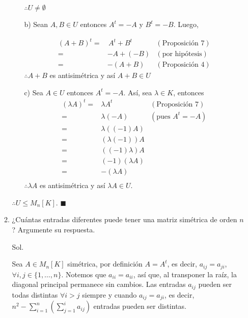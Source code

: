 \documentclass[fleqn]{article}                       %
\begin{document}
\begin{enumerate}
\begin{enumerate}
\begin{enumerate}
                $ \therefore U \neq \emptyset $

                \item[b)] Sean $ A, B \in U $ entonces $ A^t = -A $ y $ B^t = -B $. Luego, \par
                \begin{align*}
                    (A + B)^t =& \, A^t + B^t & (\text{Proposición 7}) \\
                    =& -A + (-B) & (\text{por hipótesis}) \\
                    =& -(A + B) & (\text{Proposición 4})
                \end{align*}
                $ \therefore A + B $ es antisimétrica y así $ A + B \in U $

                \item[c)] Sea $ A \in U $ entonces $ A^t = -A $. Así, sea $ \lambda \in K $, entonces
                \begin{align*}
                    (\lambda A)^t =& \lambda A^t & (\text{Proposición 7}) \\
                    =& \lambda (-A) & (\text{pues } A^t = -A) \\
                    =& \lambda ((-1)A) \\
                    =& (\lambda (-1)) A \\
                    =& ((-1) \lambda) A \\
                    =& (-1) ( \lambda A) \\
                    =& - ( \lambda A) \\
                \end{align*}
                $ \therefore \lambda A $ es antisimétrica y así $ \lambda A \in U $.
            \end{enumerate}
            $ \therefore U \leq M_n[K] $. $ \blacksquare $
            
            \item ¿Cuántas entradas diferentes puede tener una matriz simétrica de orden $ n $? Argumente su respuesta. \par
            
            \hspace{2.7mm}  Sol. \par

            Sea $ A \in M_n[K] $ simétrica, por definición $ A = A^t $, es decir, $ a_{ij} = a_{ji} $, $ \forall i, j \in \{1, \ldots, n\} $. Notemos que $ a_{ii} = a_{ii} $, así que, al transponer la raíz, la diagonal principal permanece sin cambios. Las entradas $ a_{ij} $ pueden ser todas distintas $ \forall i > j $ siempre y cuando $ a_{ij} = a_{ji} $, es decir, $ n^2 - \displaystyle \sum_{i=1}^{n} \left(\sum_{j=1}^{i} a_{ij} \right) $ entradas pueden ser distintas.
        \end{enumerate}


\end{enumerate}
\end{document}
